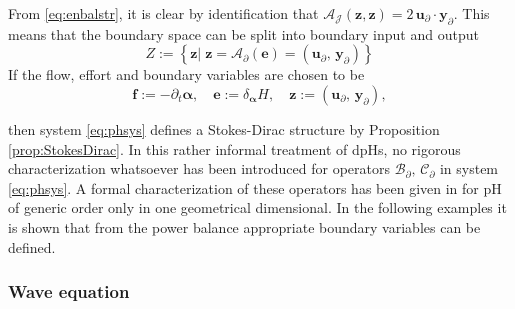 From \eqref{eq:enbalstr}, it is clear by identification that $\mathcal{A}_{\mathcal{J}}(\bm{z}, \bm{z}) = 2\,  \bm{u}_\partial \cdot \bm{y}_\partial$. This means that the boundary space can be split into boundary input and output
\begin{equation*}
{Z} := \left\{ \bm{z} \vert \; \bm{z} = \mathcal{A}_{\partial}(\bm{e}) = (\bm{u}_\partial, \, \bm{y}_\partial) \right\}
\end{equation*}
If the flow, effort and boundary variables are chosen to be
\begin{equation}
\bm{f}:= -\partial_t \bm{\alpha}, \quad \bm{e}:=\delta_{\bm\alpha} H, \quad \bm{z}:=(\bm{u}_\partial, \, \bm{y}_\partial), 
\end{equation}

then system \eqref{eq:phsys} defines a Stokes-Dirac structure by Proposition \ref{prop:StokesDirac}.  In this rather informal treatment of dpHs, no rigorous characterization whatsoever has been introduced for operators $\mathcal{B_\partial,\, C_\partial}$ in system \eqref{eq:phsys}. A formal characterization of these operators has been given in \cite{legorrec2005} for pH of generic order only in one geometrical dimensional. In the following examples it is shown that from the power balance appropriate boundary variables can be defined.

\subsubsection{Wave equation}\label{sec:waveeq}

